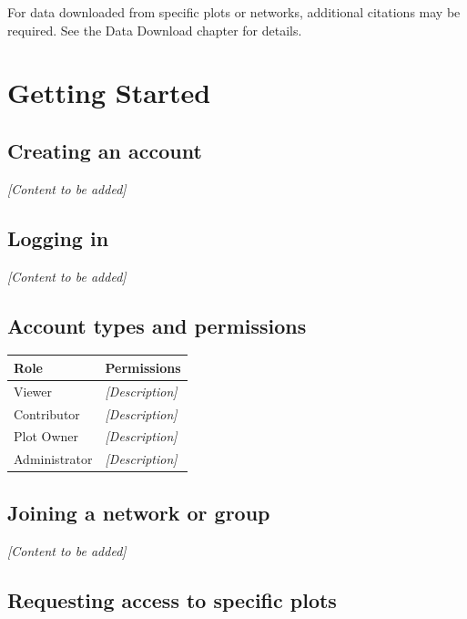 \documentclass[
]{book}
\newcounter{none} %
\begin{document}
For data downloaded from specific plots or networks, additional citations may be required. See the Data Download chapter for details.

\chapter{Getting Started}\label{getting-started}

\section{Creating an account}\label{creating-an-account}

\emph{{[}Content to be added{]}}

\section{Logging in}\label{logging-in}

\emph{{[}Content to be added{]}}

\section{Account types and permissions}\label{account-types-and-permissions}

{\def\LTcaptype{none} %
\begin{longtable}[]{@{}ll@{}}
\toprule\noalign{}
Role & Permissions \\
\midrule\noalign{}
\endhead
\bottomrule\noalign{}
\endlastfoot
Viewer & \emph{{[}Description{]}} \\
Contributor & \emph{{[}Description{]}} \\
Plot Owner & \emph{{[}Description{]}} \\
Administrator & \emph{{[}Description{]}} \\
\end{longtable}
}

\section{Joining a network or group}\label{joining-a-network-or-group}

\emph{{[}Content to be added{]}}

\section{Requesting access to specific plots}\label{requesting-access-to-specific-plots}
\end{document}
